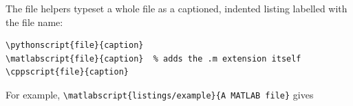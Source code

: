 \documentclass[11pt,a4paper]{article}
\begin{document}
The file helpers typeset a whole file as a captioned, indented listing
labelled with the file name:
\begin{verbatim}
\pythonscript{file}{caption}
\matlabscript{file}{caption}  % adds the .m extension itself
\cppscript{file}{caption}
\end{verbatim}
For example, \verb|\matlabscript{listings/example}{A MATLAB file}| gives

\end{document}
